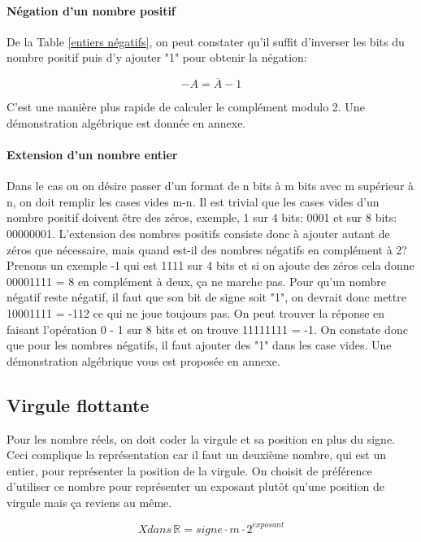 \paragraph{Négation d'un nombre positif}
De la Table \ref{entiers négatifs}, on peut constater qu'il suffit d'inverser les bits du nombre positif puis d'y ajouter "1" pour obtenir la négation:

\begin{equation}
-A = \overline{A} - 1
\end{equation}

C'est une manière plus rapide de calculer le complément modulo 2. Une démonstration algébrique est donnée en annexe.
 
\paragraph{Extension d'un nombre entier}
Dans le cas ou on désire passer d'un format de n bits à m bits avec m supérieur à n, on doit remplir les cases vides m-n. Il est trivial que les cases vides d'un nombre positif doivent être des zéros, exemple, 1 sur 4 bits: 0001 et sur 8 bits: 00000001. L'extension des nombres positifs consiste donc à ajouter autant de zéros que nécessaire, mais quand est-il des nombres négatifs en complément à 2? Prenons un exemple -1 qui est 1111 sur 4 bits et si on ajoute des zéros cela donne 00001111 = 8 en complément à deux, ça ne marche pas. Pour qu'un nombre négatif reste négatif, il faut que son bit de signe soit "1", on devrait donc mettre 10001111 = -112 ce qui ne joue toujours pas. On peut trouver la réponse en faisant l'opération 0 - 1 sur 8 bits et on trouve 11111111 = -1. On constate donc que pour les nombres négatifs, il faut ajouter des "1" dans les case vides. Une démonstration algébrique vous est proposée en annexe.
 
\subsection{Virgule flottante}
Pour les nombre réels, on doit coder la virgule et sa position en plus du signe. Ceci complique la représentation car il faut un deuxième nombre, qui est un entier, pour représenter la position de la virgule. On choisit de préférence d'utiliser  ce nombre pour représenter un exposant plutôt qu'une position de virgule mais ça reviens au même.

\begin{equation}
X dans \, \mathbb{R} = signe \cdot m \cdot 2^{exposant}
\end{equation}

